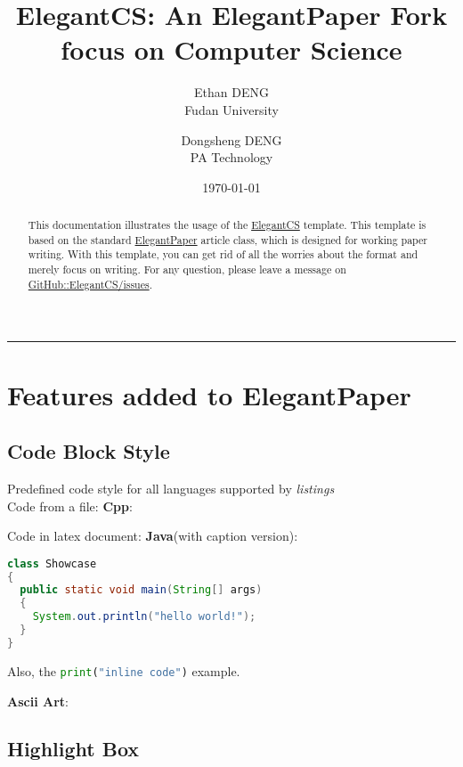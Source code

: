 \documentclass[lang=en,a4paper,bibend=bibtex]{elegantcs}
\title{ElegantCS: An ElegantPaper Fork focus on Computer Science}
\author{Ethan DENG \\ Fudan University \and Dongsheng DENG \\ PA Technology}
\institute{\href{https://github.com/ElegantLaTeX}{Elegant\LaTeX{} Program}}
\date{\today}
\begin{document}
\maketitle

\begin{abstract}
This documentation illustrates the usage of the \href{https://github.com/Ziqi-Yang/ElegantCS}{ElegantCS} template. This template is based on the standard \href{https://github.com/ElegantLaTeX/ElegantPaper}{ElegantPaper} article class, which is designed for working paper writing. With this template, you can get rid of all the worries about the format and merely focus on writing. For any question, please leave a message on \href{https://github.com/Ziqi-Yang/ElegantCS/issues}{GitHub::ElegantCS/issues}.\par
{}
\end{abstract}


\noindent\rule{\textwidth}{1pt}

\section*{Features added to ElegantPaper}

\subsection*{Code Block Style}

Predefined code style for all languages supported by \textit{listings}\\
Code from a file:
\textbf{Cpp}:


Code in latex document:
\textbf{Java}(with caption version):
\begin{lstlisting}[language=Java, caption={Showcase.java}]
class Showcase
{
  public static void main(String[] args)
  {
    System.out.println("hello world!");
  }
}
\end{lstlisting}

Also, the \lstinline[language=Python]|print("inline code")| example.

\textbf{Ascii Art}:
\setmonofont{Quivira}



\subsection*{Highlight Box}
\end{document}
